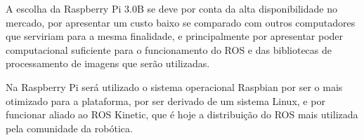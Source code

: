 \begin{table}[]
	\centering
	\caption{Relação dos Componentes Presentes no Kit Físico.}
	\label{tab:quad01}
\end{table}

A escolha da Raspberry Pi 3.0B se deve por conta da alta disponibilidade no mercado, por apresentar um custo baixo se comparado com outros computadores que serviriam para a mesma finalidade, e principalmente por apresentar poder computacional suficiente para o funcionamento do ROS e das bibliotecas de processamento de imagens que serão utilizadas.

Na Raspberry Pi será utilizado o sistema operacional Raspbian por ser o mais otimizado para a plataforma, por ser derivado de um sistema Linux, e por funcionar
aliado ao ROS Kinetic, que é hoje a distribuição do ROS mais utilizada pela comunidade da robótica.

